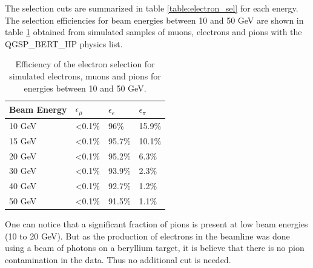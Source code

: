 The selection cuts are summarized in table \ref{table:electron_sel} for each energy. The selection efficiencies for beam energies between 10 and 50 GeV are shown in table \ref{table:eff_electron} obtained from simulated samples of muons, electrons and pions with the QGSP\_BERT\_HP physics list.

\begin{table}[htb!]
	\centering
	\caption{Efficiency of the electron selection for simulated electrons, muons and pions for energies between 10 and 50 GeV.}
	\label{table:eff_electron}
	\begin{tabular}{@{} llll @{}}
		\hline
		\textbf{Beam Energy} & \textbf{$\epsilon_{\mu}$} & \textbf{$\epsilon_{e}$} & \textbf{$\epsilon_{\pi}$}\\
		\hline
		10 GeV & <0.1\% & 96\% & 15.9\%\\
		15 GeV & <0.1\% & 95.7\% & 10.1\%\\
		20 GeV & <0.1\% & 95.2\% & 6.3\%\\
		30 GeV & <0.1\% & 93.9\% & 2.3\%\\
		40 GeV & <0.1\% & 92.7\% & 1.2\%\\
		50 GeV & <0.1\% & 91.5\% & 1.1\%\\
		\hline
	\end{tabular}
\end{table}

One can notice that a significant fraction of pions is present at low beam energies (10 to 20 GeV). But as the production of electrons in the beamline was done using a beam of photons on a beryllium target, it is believe that there is no pion contamination in the data. Thus no additional cut is needed.

